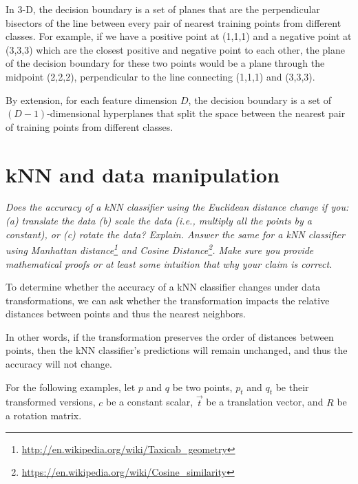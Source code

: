 \documentclass[fleqn]{article}
\begin{document}
In 3-D, the decision boundary is a set of planes that are the perpendicular bisectors of the line between every pair of nearest training points from different classes.
For example, if we have a positive point at (1,1,1) and a negative point at (3,3,3) which are the closest positive and negative point to each other,
the plane of the decision boundary for these two points would be a plane through the midpoint (2,2,2), perpendicular to the line connecting (1,1,1) and (3,3,3).

By extension, for each feature dimension $D$, the decision boundary is a set of $(D-1)$-dimensional hyperplanes that split the space between the nearest pair of training points from different classes.

\section{kNN and data manipulation}
\textit{Does the accuracy of a kNN classifier using the Euclidean distance change if you:(a) translate the data (b) scale the data (i.e., multiply all the points by a constant), or (c) rotate the data? Explain. Answer the same for a kNN classifier using Manhattan distance\footnote{\url{http://en.wikipedia.org/wiki/Taxicab_geometry}} and Cosine Distance\footnote{\url{https://en.wikipedia.org/wiki/Cosine_similarity}}. Make sure you provide mathematical proofs or at least some intuition that why your claim is correct.}

To determine whether the accuracy of a kNN classifier changes under data transformations,
we can ask whether the transformation impacts the relative distances between points and thus the nearest neighbors.

In other words, if the transformation preserves the order of distances between points,
then the kNN classifier's predictions will remain unchanged, and thus the accuracy will not change.

For the following examples, let $p$ and $q$ be two points, $p_t$ and $q_t$ be their transformed versions, $c$ be a constant scalar, $\vec{t}$ be a translation vector, and $R$ be a rotation matrix.
\end{document}
